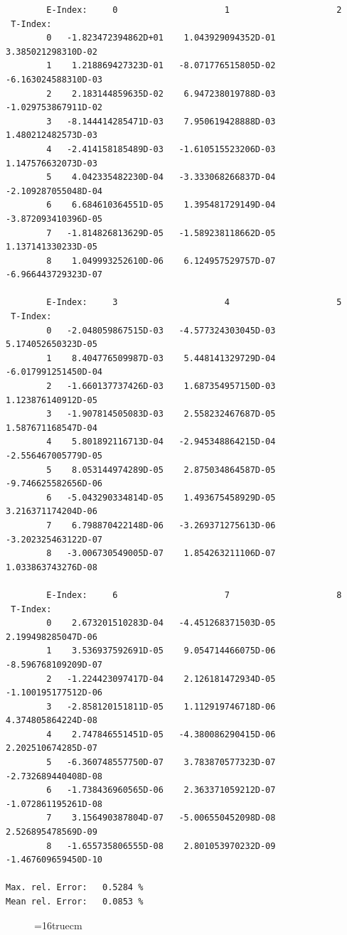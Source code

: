 \documentclass[12pt,dvips]{article}
\begin{document}
\begin{small}\begin{verbatim}
        E-Index:     0                     1                     2
 T-Index:
        0   -1.823472394862D+01    1.043929094352D-01    3.385021298310D-02
        1    1.218869427323D-01   -8.071776515805D-02   -6.163024588310D-03
        2    2.183144859635D-02    6.947238019788D-03   -1.029753867911D-02
        3   -8.144414285471D-03    7.950619428888D-03    1.480212482573D-03
        4   -2.414158185489D-03   -1.610515523206D-03    1.147576632073D-03
        5    4.042335482230D-04   -3.333068266837D-04   -2.109287055048D-04
        6    6.684610364551D-05    1.395481729149D-04   -3.872093410396D-05
        7   -1.814826813629D-05   -1.589238118662D-05    1.137141330233D-05
        8    1.049993252610D-06    6.124957529757D-07   -6.966443729323D-07

        E-Index:     3                     4                     5
 T-Index:
        0   -2.048059867515D-03   -4.577324303045D-03    5.174052650323D-05
        1    8.404776509987D-03    5.448141329729D-04   -6.017991251450D-04
        2   -1.660137737426D-03    1.687354957150D-03    1.123876140912D-05
        3   -1.907814505083D-03    2.558232467687D-05    1.587671168547D-04
        4    5.801892116713D-04   -2.945348864215D-04   -2.556467005779D-05
        5    8.053144974289D-05    2.875034864587D-05   -9.746625582656D-06
        6   -5.043290334814D-05    1.493675458929D-05    3.216371174204D-06
        7    6.798870422148D-06   -3.269371275613D-06   -3.202325463122D-07
        8   -3.006730549005D-07    1.854263211106D-07    1.033863743276D-08

        E-Index:     6                     7                     8
 T-Index:
        0    2.673201510283D-04   -4.451268371503D-05    2.199498285047D-06
        1    3.536937592691D-05    9.054714466075D-06   -8.596768109209D-07
        2   -1.224423097417D-04    2.126181472934D-05   -1.100195177512D-06
        3   -2.858120151811D-05    1.112919746718D-06    4.374805864224D-08
        4    2.747846551451D-05   -4.380086290415D-06    2.202510674285D-07
        5   -6.360748557750D-07    3.783870577323D-07   -2.732689440408D-08
        6   -1.738436960565D-06    2.363371059212D-07   -1.072861195261D-08
        7    3.156490387804D-07   -5.006550452098D-08    2.526895478569D-09
        8   -1.655735806555D-08    2.801053970232D-09   -1.467609659450D-10

Max. rel. Error:   0.5284 %
Mean rel. Error:   0.0853 %
\end{verbatim}\end{small}
\begin{figure} \label{0.1T}
\epsfxsize=16truecm
\end{figure}
\newpage
\end{document}
